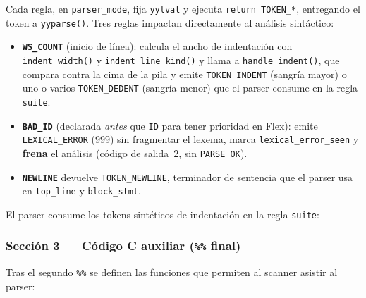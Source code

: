 Cada regla, en \texttt{parser\_mode}, fija \texttt{yylval} y ejecuta
\texttt{return TOKEN\_*}, entregando el token a \texttt{yyparse()}. Tres
reglas impactan directamente al análisis sintáctico:

\begin{itemize}
  \item \textbf{\texttt{WS\_COUNT}} (inicio de línea): calcula el ancho de
    indentación con \texttt{indent\_width()} y \texttt{indent\_line\_kind()} y
    llama a \texttt{handle\_indent()}, que compara contra la cima de la pila
    y emite \texttt{TOKEN\_INDENT} (sangría mayor) o uno o varios
    \texttt{TOKEN\_DEDENT} (sangría menor) que el parser consume en la regla
    \texttt{suite}.
  \item \textbf{\texttt{BAD\_ID}} (declarada \emph{antes} que \texttt{ID}
    para tener prioridad en Flex): emite \texttt{LEXICAL\_ERROR} (999) sin
    fragmentar el lexema, marca \texttt{lexical\_error\_seen} y \textbf{frena}
    el análisis (código de salida~2, sin \texttt{PARSE\_OK}).
  \item \textbf{\texttt{NEWLINE}} devuelve \texttt{TOKEN\_NEWLINE}, terminador
    de sentencia que el parser usa en \texttt{top\_line} y \texttt{block\_stmt}.
\end{itemize}



El parser consume los tokens sintéticos de indentación en la regla
\texttt{suite}:



\subsubsection{Sección 3 --- Código C auxiliar (\texttt{\%\%} final)}

Tras el segundo \texttt{\%\%} se definen las funciones que permiten al scanner
asistir al parser:

